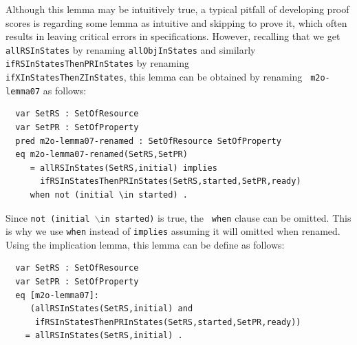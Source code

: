 \documentclass[12pt]{report}
\newcommand{\stt}[1]{{\small{\tt {#1}}}}
\begin{document}
\normalsize
Although this lemma may be intuitively true, a typical pitfall of
developing proof scores is regarding some lemma as intuitive and
skipping to prove it, which often results in leaving critical errors
in specifications. However, recalling that we get {\tt allRSInStates}
by renaming {\tt allObjInStates} and similarly
{\tt ifRSInStatesThenPRInStates} by renaming\\
{\tt ifXInStatesThenZInStates}, this lemma can be obtained by renaming {\tt
  m2o-lemma07} as follows:
\small
\begin{verbatim}
  var SetRS : SetOfResource
  var SetPR : SetOfProperty
  pred m2o-lemma07-renamed : SetOfResource SetOfProperty
  eq m2o-lemma07-renamed(SetRS,SetPR)
     = allRSInStates(SetRS,initial) implies 
       ifRSInStatesThenPRInStates(SetRS,started,SetPR,ready)
     when not (initial \in started) .
\end{verbatim}
\normalsize
Since \stt{not (initial $\backslash$in started)} is true, the {\tt
  when} clause can be omitted. This is why we use {\tt when} instead
of {\tt implies} assuming it will omitted when renamed. Using the
implication lemma, this lemma can be define as follows:
\small
\begin{verbatim}
  var SetRS : SetOfResource
  var SetPR : SetOfProperty
  eq [m2o-lemma07]:
     (allRSInStates(SetRS,initial) and
      ifRSInStatesThenPRInStates(SetRS,started,SetPR,ready))
    = allRSInStates(SetRS,initial) .
\end{verbatim}
\normalsize
\end{document}
